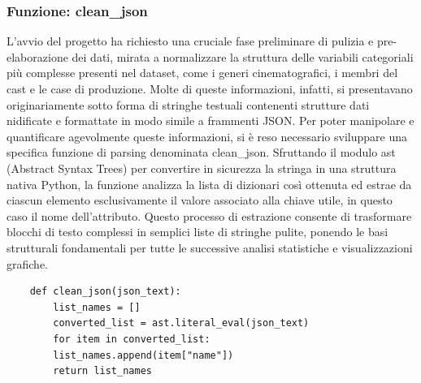 \documentclass{article}
\begin{document}
\subsubsection{Funzione: clean\_json}
L'avvio del progetto ha richiesto una cruciale fase preliminare di pulizia e pre-elaborazione dei dati, mirata a normalizzare la struttura delle variabili categoriali pi\`u complesse presenti nel dataset, come i generi cinematografici, i membri del cast e le case di produzione. Molte di queste informazioni, infatti, si presentavano originariamente sotto forma di stringhe testuali contenenti strutture dati nidificate e formattate in modo simile a frammenti JSON. Per poter manipolare e quantificare agevolmente queste informazioni, si \`e reso necessario sviluppare una specifica funzione di parsing denominata clean\_json. Sfruttando il modulo ast (Abstract Syntax Trees) per convertire in sicurezza la stringa in una struttura nativa Python, la funzione analizza la lista di dizionari cos\`i ottenuta ed estrae da ciascun elemento esclusivamente il valore associato alla chiave utile, in questo caso il nome dell'attributo. Questo processo di estrazione consente di trasformare blocchi di testo complessi in semplici liste di stringhe pulite, ponendo le basi strutturali fondamentali per tutte le successive analisi statistiche e visualizzazioni grafiche.
\begin{lstlisting}
	def clean_json(json_text):
		list_names = []
		converted_list = ast.literal_eval(json_text)
		for item in converted_list:
		list_names.append(item["name"])
		return list_names
\end{lstlisting}
\end{document}
